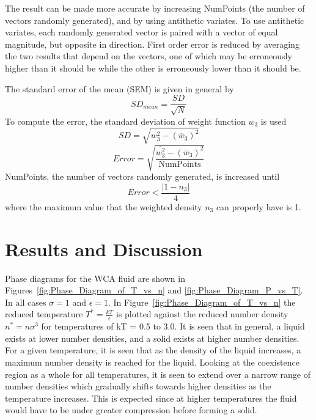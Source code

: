 \documentclass[double,12pt]{beavtex}
\begin{document}
The result can be made more accurate by increasing NumPoints (the 
number of vectors randomly generated), and by using antithetic variates.
To use antithetic variates, each randomly generated  vector is paired 
with a vector of equal magnitude, but opposite in direction. 
First order error is reduced by averaging the two results that depend on 
the vectors, one of which may be erroneously higher than it should be 
while the other is erroneously lower than it should be.

The standard error of the mean (SEM) is given in general by
\begin{equation}{SD_{mean}=\frac{SD}{\sqrt{N}}}\end{equation} 
To compute the error, the standard deviation of weight function $w_3$ is used 
\begin{equation}SD=\sqrt{\overline{w_3^2}-(\overline{w}_3)^2}\end{equation} 
\begin{equation}{Error=\sqrt{\frac{\overline{w_3^2}-(\overline{w}_3)^2}{\text{NumPoints}}}}\end{equation} 
NumPoints, the number of vectors randomly generated, is increased until
\begin{equation}{Error<\frac{|1-n_3|}{4}}\end{equation}
where the maximum value that the weighted density $n_3$ 
can properly have is 1.

\chapter{Results and Discussion}

Phase diagrams for the WCA fluid are shown in Figures~\ref{fig:Phase_Diagram_of_T_vs_n} 
and \ref{fig:Phase_Diagram_P_vs_T}. In all cases $\sigma=1$ and $\epsilon=1$. 
In Figure~\ref{fig:Phase_Diagram_of_T_vs_n} the reduced temperature 
$T^*=\frac{kT}{\epsilon}$ is plotted against the reduced number density 
$n^*=n\sigma^3$ for temperatures of kT = 0.5 to 3.0. 
It is seen that in general, a liquid exists at lower number densities, 
and a solid exists at higher number densities. 
For a given temperature, it is seen that as the density of the 
liquid increases, a maximum number density is reached for the liquid. 
Looking at the coexistence region as a whole for all temperatures, 
it is seen to extend over a narrow range of number densities which 
gradually shifts towards higher densities as the temperature increases. 
This is expected since at higher temperatures the fluid would have to 
be under greater compression before forming a solid. 
\end{document}
